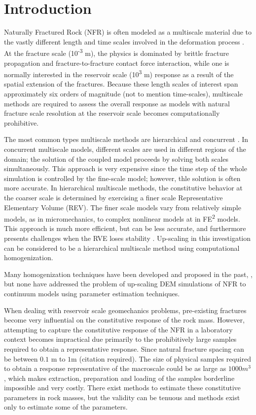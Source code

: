 \section{Introduction}
Naturally Fractured Rock (NFR) is often modeled as a multiscale material due to the vastly different length and time scales involved in the deformation process \citep{zhou_flow_2003}. At the fracture scale (10\textsuperscript{-3} m), the physics is dominated by brittle fracture propagation and fracture-to-fracture contact force interaction, while one is normally interested in the reservoir scale (10\textsuperscript{3} m) response as a result of the spatial extension of the fractures. Because these length scales of interest span approximately six orders of magnitude (not to mention time-scales), multiscale methods are required to assess the overall response as models with natural fracture scale resolution at the reservoir scale becomes computationally prohibitive.

The most common types multiscale methods are hierarchical and concurrent \citep{Gracie_2011}. In concurrent multiscale models, different scales are used in different regions of the domain; the solution of the coupled model proceeds by solving both scales simultaneously. This approach is very expensive since the time step of the whole simulation is controlled by the fine-scale model; however, thle solution is often more accurate.  In hierarchical multiscale methods, the constitutive behavior at the coarser scale is determined by exercising a finer scale Representative Elementary Volume (REV). The finer scale models vary from relatively simple models, as in micromechanics, to complex nonlinear models at in FE\textsuperscript{2} models\citep{Feyel_2003}. This approach is much more efficient, but can be less accurate, and furthermore  presents challenges when the RVE loses stability \citep{Belytschko_2008}. Up-scaling in this investigation can be considered to be a hierarchical multiscale method using computational homogenization. 

Many homogenization techniques have been developed and proposed in the past, \citep{Aanonsen_2006,Temizer_2009,Loehnert_2005}, but none have addressed the problem of up-scaling DEM simulations of NFR to continuum models using parameter estimation techniques.

When dealing with reservoir scale geomechanics problems, pre-existing fractures become very influential on the constitutive response of the rock mass. However, attempting to capture the constitutive response of the NFR in a laboratory context becomes impractical due primarily to the prohibitively large samples required to obtain a representative response. Since natural fracture spacing can be between $0.1$ m to $1$m (citation required). The size of physical samples required to obtain a response representative of the macroscale could be as large as $1000 m^3$, which makes extraction, preparation and loading of the samples borderline impossible and very costly. There exist methods to estimate these constitutive parameters in rock masses, but the validity can be tenuous and methods exist only to estimate some of the parameters. 


